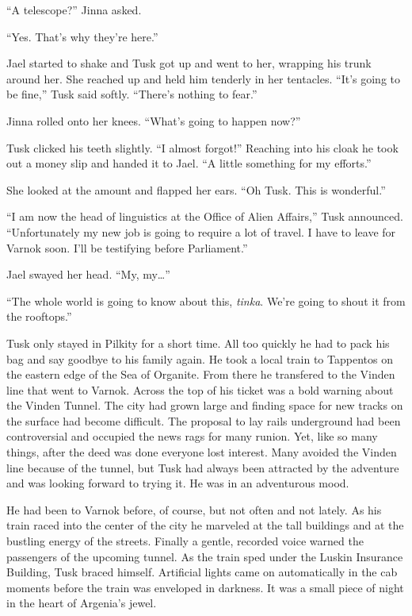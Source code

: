 ``A telescope?'' Jinna asked.

``Yes. That's why they're here.''

Jael started to shake and Tusk got up and went to her, wrapping his trunk around her. She
reached up and held him tenderly in her tentacles. ``It's going to be fine,'' Tusk said softly.
``There's nothing to fear.''

Jinna rolled onto her knees. ``What's going to happen now?''

Tusk clicked his teeth slightly. ``I almost forgot!'' Reaching into his cloak he took out a
money slip and handed it to Jael. ``A little something for my efforts.''

She looked at the amount and flapped her ears. ``Oh Tusk. This is wonderful.''

``I am now the head of linguistics at the Office of Alien Affairs,'' Tusk announced.
``Unfortunately my new job is going to require a lot of travel. I have to leave for Varnok soon.
I'll be testifying before Parliament.''

Jael swayed her head. ``My, my\ldots''

``The whole world is going to know about this, \textit{tinka}. We're going to shout it from the
rooftops.''

Tusk only stayed in Pilkity for a short time. All too quickly he had to pack his bag and say
goodbye to his family again. He took a local train to Tappentos on the eastern edge of the Sea
of Organite. From there he transfered to the Vinden line that went to Varnok. Across the top of
his ticket was a bold warning about the Vinden Tunnel. The city had grown large and finding
space for new tracks on the surface had become difficult. The proposal to lay rails underground
had been controversial and occupied the news rags for many runion. Yet, like so many things,
after the deed was done everyone lost interest. Many avoided the Vinden line because of the
tunnel, but Tusk had always been attracted by the adventure and was looking forward to trying
it. He was in an adventurous mood.

He had been to Varnok before, of course, but not often and not lately. As his train raced into
the center of the city he marveled at the tall buildings and at the bustling energy of the
streets. Finally a gentle, recorded voice warned the passengers of the upcoming tunnel. As the
train sped under the Luskin Insurance Building, Tusk braced himself. Artificial lights came on
automatically in the cab moments before the train was enveloped in darkness. It was a small
piece of night in the heart of Argenia's jewel.

